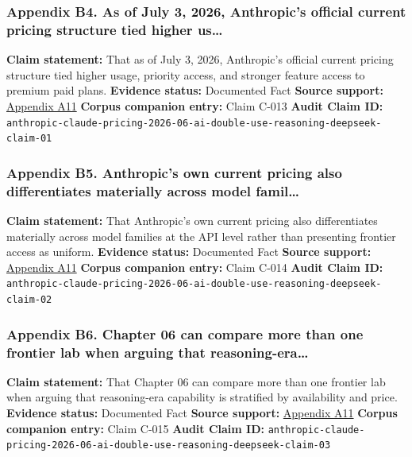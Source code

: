 \documentclass[
  american,
  11pt,
  letterpaper,
]{article}
\begin{document}
\subsubsection{Appendix B4. As of July 3, 2026, Anthropic's official
current pricing structure tied higher
us\ldots{}}\label{ch-06-appendix-b4-as-of-july-3-2026-anthropic-s-official-current-pricing-structure-tied-higher-us}

\textbf{Claim statement:} That as of July 3, 2026, Anthropic's official
current pricing structure tied higher usage, priority access, and
stronger feature access to premium paid plans. \textbf{Evidence status:}
Documented Fact \textbf{Source support:}
\hyperref[ch-06-appendix-a11-plans-pricing-claude-by-anthropic]{Appendix
A11} \textbf{Corpus companion entry:} Claim C-013 \textbf{Audit Claim
ID:}
\texttt{anthropic-claude-pricing-2026-06-ai-double-use-reasoning-deepseek-claim-01}

\subsubsection{Appendix B5. Anthropic's own current pricing also
differentiates materially across model
famil\ldots{}}\label{ch-06-appendix-b5-anthropic-s-own-current-pricing-also-differentiates-materially-across-model-famil}

\textbf{Claim statement:} That Anthropic's own current pricing also
differentiates materially across model families at the API level rather
than presenting frontier access as uniform. \textbf{Evidence status:}
Documented Fact \textbf{Source support:}
\hyperref[ch-06-appendix-a11-plans-pricing-claude-by-anthropic]{Appendix
A11} \textbf{Corpus companion entry:} Claim C-014 \textbf{Audit Claim
ID:}
\texttt{anthropic-claude-pricing-2026-06-ai-double-use-reasoning-deepseek-claim-02}

\subsubsection{Appendix B6. Chapter 06 can compare more than one
frontier lab when arguing that
reasoning-era\ldots{}}\label{ch-06-appendix-b6-chapter-06-can-compare-more-than-one-frontier-lab-when-arguing-that-reasoning-era}

\textbf{Claim statement:} That Chapter 06 can compare more than one
frontier lab when arguing that reasoning-era capability is stratified by
availability and price. \textbf{Evidence status:} Documented Fact
\textbf{Source support:}
\hyperref[ch-06-appendix-a11-plans-pricing-claude-by-anthropic]{Appendix
A11} \textbf{Corpus companion entry:} Claim C-015 \textbf{Audit Claim
ID:}
\texttt{anthropic-claude-pricing-2026-06-ai-double-use-reasoning-deepseek-claim-03}
\end{document}
